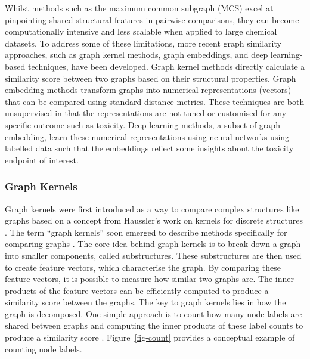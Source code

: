 \documentclass[
  super,
  preprint,
  3p]{elsarticle}
\begin{document}
Whilst methods such as the maximum common subgraph (MCS) excel at
pinpointing shared structural features in pairwise comparisons, they can
become computationally intensive and less scalable when applied to large
chemical datasets. To address some of these limitations, more recent
graph similarity approaches, such as graph kernel methods, graph
embeddings, and deep learning-based techniques, have been developed.
Graph kernel methods directly calculate a similarity score between two
graphs based on their structural properties. Graph embedding methods
transform graphs into numerical representations (vectors) that can be
compared using standard distance metrics. These techniques are both
unsupervised in that the representations are not tuned or customised for
any specific outcome such as toxicity. Deep learning methods, a subset
of graph embedding, learn these numerical representations using neural
networks using labelled data such that the embeddings reflect some
insights about the toxicity endpoint of interest.

\subsubsection{Graph Kernels}\label{graph-kernels}

Graph kernels were first introduced as a way to compare complex
structures like graphs based on a concept from Haussler's work on
kernels for discrete structures \citep{kondor_diffusion_2002}. The term
``graph kernels'' soon emerged to describe methods specifically for
comparing graphs \citep{RN27, RN45, scholkopf_fast_2007}. The core idea
behind graph kernels is to break down a graph into smaller components,
called substructures. These substructures are then used to create
feature vectors, which characterise the graph. By comparing these
feature vectors, it is possible to measure how similar two graphs are.
The inner products of the feature vectors can be efficiently computed to
produce a similarity score between the graphs. The key to graph kernels
lies in how the graph is decomposed. One simple approach is to count how
many node labels are shared between graphs and computing the inner
products of these label counts to produce a similarity score
\citep{kriege_survey_2020}. Figure~\ref{fig-count} provides a conceptual
example of counting node labels.
\end{document}
